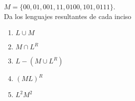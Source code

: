 \documentclass{article}
\begin{document}
\begin{enumerate}
{            $M = \{ 00, 01, 001, 11, 0100, 101, 0111 \}$.\\
            Da los lenguajes resultantes de cada inciso
            \begin{enumerate}
                \item {
                    $L \cup M$
                }
                \item {
                    $M \cap L^R$
                }
                \item {
                    $L - (M \cup L^R)$
                }
                \item {
                    $(ML)^R$
                }
                \item {
                    $L^2M^2$
                }
            \end{enumerate}
        }
    \end{enumerate}
\end{document}
